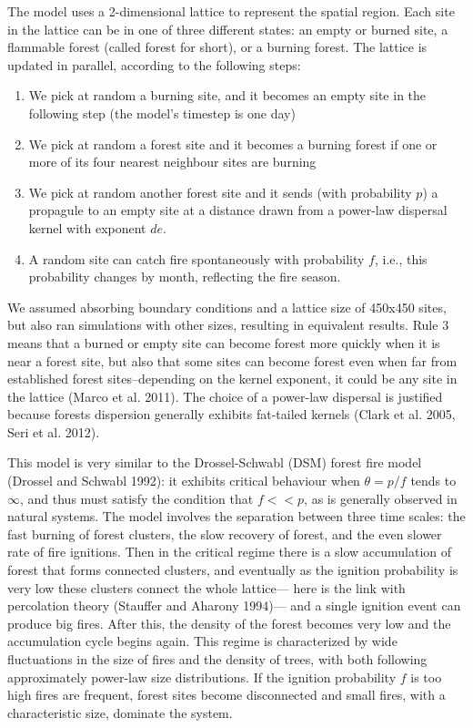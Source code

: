 \documentclass[
]{article}
\begin{document}
The model uses a 2-dimensional lattice to represent the spatial region.
Each site in the lattice can be in one of three different states: an
empty or burned site, a flammable forest (called forest for short), or a
burning forest. The lattice is updated in parallel, according to the
following steps:

\begin{enumerate}
\def\labelenumi{\arabic{enumi}.}
\item
  We pick at random a burning site, and it becomes an empty site in the
  following step (the model's timestep is one day)
\item
  We pick at random a forest site and it becomes a burning forest if one
  or more of its four nearest neighbour sites are burning
\item
  We pick at random another forest site and it sends (with probability
  \(p\)) a propagule to an empty site at a distance drawn from a
  power-law dispersal kernel with exponent \(de\).
\item
  A random site can catch fire spontaneously with probability \(f\),
  i.e., this probability changes by month, reflecting the fire season.
\end{enumerate}

We assumed absorbing boundary conditions and a lattice size of 450x450
sites, but also ran simulations with other sizes, resulting in
equivalent results. Rule 3 means that a burned or empty site can become
forest more quickly when it is near a forest site, but also that some
sites can become forest even when far from established forest
sites--depending on the kernel exponent, it could be any site in the
lattice (Marco et al. 2011). The choice of a power-law dispersal is
justified because forests dispersion generally exhibits fat-tailed
kernels (Clark et al. 2005, Seri et al. 2012).

This model is very similar to the Drossel-Schwabl (DSM) forest fire
model (Drossel and Schwabl 1992): it exhibits critical behaviour when
\(\theta = p/f\) tends to \(\infty\), and thus must satisfy the
condition that \(f << p\), as is generally observed in natural systems.
The model involves the separation between three time scales: the fast
burning of forest clusters, the slow recovery of forest, and the even
slower rate of fire ignitions. Then in the critical regime there is a
slow accumulation of forest that forms connected clusters, and
eventually as the ignition probability is very low these clusters
connect the whole lattice--- here is the link with percolation theory
(Stauffer and Aharony 1994)--- and a single ignition event can produce
big fires. After this, the density of the forest becomes very low and
the accumulation cycle begins again. This regime is characterized by
wide fluctuations in the size of fires and the density of trees, with
both following approximately power-law size distributions. If the
ignition probability \(f\) is too high fires are frequent, forest sites
become disconnected and small fires, with a characteristic size,
dominate the system.
\end{document}
